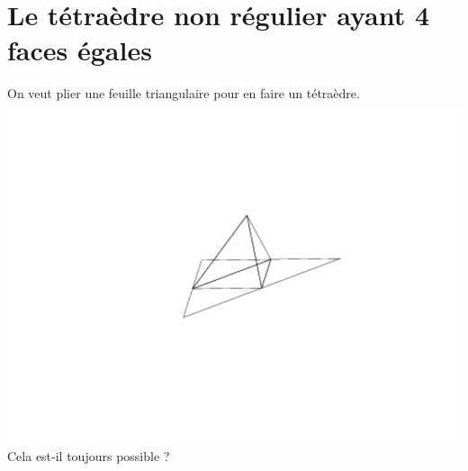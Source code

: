 \documentclass[a4paper,11pt]{book}
\begin{document}
\section{Le t\'etra\`edre non r\'egulier ayant 4 faces \'egales}
On veut plier une feuille triangulaire pour en faire un t\'etra\`edre.\\
\includegraphics[width=\textwidth]{troisgeo33}\\
Cela est-il toujours possible ?\\
\end{document}
